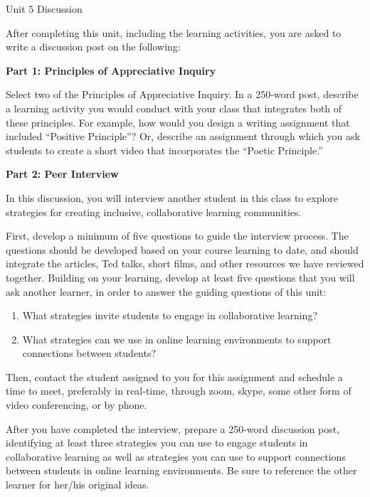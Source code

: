 \documentclass[
]{book}
\providecommand{\tightlist}{%
  \setlength{\itemsep}{0pt}\setlength{\parskip}{0pt}}
\begin{document}
\begin{assessment}
{Unit 5 Discussion}

After completing this unit, including the learning activities, you are
asked to write a discussion post on the following:

\textbf{Part 1: Principles of Appreciative Inquiry}

Select two of the Principles of Appreciative Inquiry. In a 250-word
post, describe a learning activity you would conduct with your class
that integrates both of these principles. For example, how would you
design a writing assignment that included ``Positive Principle''? Or,
describe an assignment through which you ask students to create a short
video that incorporates the ``Poetic Principle.''

\textbf{Part 2: Peer Interview}

In this discussion, you will interview another student in this class to
explore strategies for creating inclusive, collaborative learning
communities.

First, develop a minimum of five questions to guide the interview
process. The questions should be developed based on your course learning
to date, and should integrate the articles, Ted talks, short films, and
other resources we have reviewed together. Building on your learning,
develop at least five questions that you will ask another learner, in
order to answer the guiding questions of this unit:

\begin{enumerate}
\def\labelenumi{\arabic{enumi}.}
\tightlist
\item
  What strategies invite students to engage in collaborative learning?\\
\item
  What strategies can we use in online learning environments to support
  connections between students?
\end{enumerate}

Then, contact the student assigned to you for this assignment and
schedule a time to meet, preferably in real-time, through zoom, skype,
some other form of video conferencing, or by phone.

After you have completed the interview, prepare a 250-word discussion
post, identifying at least three strategies you can use to engage
students in collaborative learning as well as strategies you can use to
support connections between students in online learning environments. Be
sure to reference the other learner for her/his original ideas.
\end{assessment}
\end{document}
